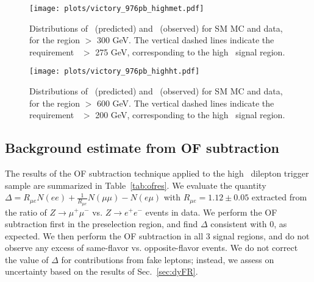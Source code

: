 \begin{figure}[h!]
\begin{center}
\texttt{[image: plots/victory\_976pb\_highmet.pdf]}
\caption{\label{fig:v2}\protect 
Distributions of \ptll\ (predicted) and \met\ (observed) for 
SM MC and data, for the region \Ht $>$ 300 GeV. 
The vertical dashed lines indicate the requirement \met\ $>$ 275 GeV, corresponding to the high \met\ signal region.
}
\end{center}
\end{figure}

\begin{figure}[tbh]
\begin{center}
\texttt{[image: plots/victory\_976pb\_highht.pdf]}
\caption{\label{fig:vic3}\protect 
Distributions of \ptll\ (predicted) and \met\ (observed) for 
SM MC and data, for the region \Ht $>$ 600 GeV. 
The vertical dashed lines indicate the requirement \met\ $>$ 200 GeV, corresponding to the high \Ht\ signal region.
}
\end{center}
\end{figure}

\clearpage

\subsection{Background estimate from OF subtraction}
\label{sec:ofres}

The results of the OF subtraction technique applied to the high \pt\ dilepton trigger sample are summarized in Table~\ref{tab:ofres}. 
We evaluate the quantity $\Delta = R_{\mu e}N(ee) + \frac{1}{R_{\mu e}}N(\mu\mu) - N(e\mu)$ with $R_{\mu e} = 1.12 \pm 0.05$
extracted from the ratio of $Z \to \mu^+\mu^-$ vs. $Z \to e^+e^-$ events in data.
We perform the OF subtraction first in the preselection region, and find $\Delta$ consistent with 0, as expected.
We then perform the OF subtraction in all 3 signal regions, and do not observe any excess of same-flavor vs. opposite-flavor events.
We do not correct the value of $\Delta$ for contributions from fake leptons; instead, we assess on uncertainty based on
the results of Sec.~\ref{sec:dyFR}.

